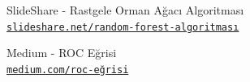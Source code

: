 \documentclass[conference]{IEEEtran}
\begin{document}
\begin{thebibliography}{22}
SlideShare - Rastgele Orman Ağacı Algoritması
\\\texttt{\href{https://www.slideshare.net/SezerFidanc/random-forest-algoritmas}{\nolinkurl{slideshare.net/random-forest-algoritması}}}

Medium - ROC Eğrisi
\\\texttt{\href{https://bernatas.medium.com/roc-eğrisi-ve-eğri-altında-kalan-alan-auc-97b058e8e0cf}{\nolinkurl{medium.com/roc-eğrisi}}}


\end{thebibliography}
\end{document}

